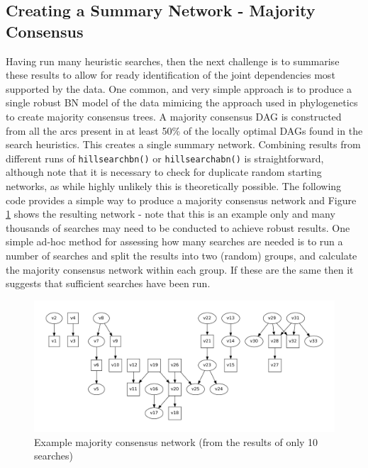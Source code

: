 \documentclass[nojss]{jss}
\begin{document}
\subsection{Creating a Summary Network - Majority Consensus}\label{mcn}
Having run many heuristic searches, then the next challenge is to summarise these results to allow for ready identification of the joint dependencies most supported by the data. One common, and very simple approach is to produce a single robust BN model of the data mimicing the approach used in phylogenetics to create majority consensus trees. A majority consensus DAG is constructed from all the arcs present in at least 50\% of the locally optimal DAGs found in the search heuristics. This creates a single summary network. Combining results from different runs of {\tt hillsearchbn()} or {\tt hillsearchabn()} is straightforward, although note that it is necessary to check for duplicate random starting networks, as while highly unlikely this is theoretically possible. The following code provides a simple way to produce a majority consensus network and Figure \ref{fig5} shows the resulting network - note that this is an example only and many thousands of searches may need to be conducted to achieve robust results. One simple ad-hoc method for assessing how many searches are needed is to run a number of searches and split the results into two (random) groups, and calculate the majority consensus network within each group. If these are the same then it suggests that sufficient searches have been run.   

\begin{figure}[htb]
\includegraphics{dagcon}
\vspace{-1.0cm}
\caption{Example majority consensus network (from the results of only 10 searches)} \label{fig5}
\end{figure}
\end{document}
